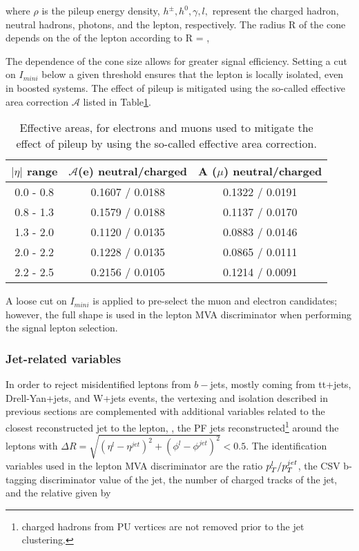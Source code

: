 \noindent where $\rho$ is the pileup energy density, $h^\pm, h^0, \gamma, l,$ represent the charged hadron, neutral hadrons, photons, and the lepton, respectively. The radius R of the cone depends on the \pt of the lepton according to 
\beqn
R = ,
\eeqn

The \pt dependence of the cone size allows for greater signal efficiency. Setting a cut on $I_{mini}$ below a given threshold ensures that the lepton is locally isolated, even in boosted systems. The effect of pileup is mitigated using the so-called effective area correction $\mathcal{A}$ listed in Table\ref{tab:pileup_area}. 

\begin{table}[!htbp]
\centering
\small
\begin{tabular}{ccc}\hline
$|\eta|$ range & $\mathcal{A}$(e) neutral/charged & A ($\mu$) neutral/charged \\\hline
0.0 - 0.8      & 0.1607 / 0.0188                  & 0.1322 / 0.0191 \\
0.8 - 1.3      & 0.1579 / 0.0188                  & 0.1137 / 0.0170 \\
1.3 - 2.0      & 0.1120 / 0.0135                  & 0.0883 / 0.0146 \\
2.0 - 2.2      & 0.1228 / 0.0135                  & 0.0865 / 0.0111 \\
2.2 - 2.5      & 0.2156 / 0.0105                  & 0.1214 / 0.0091 \\ \hline
\end{tabular}
\caption[Effective areas, for electrons and muons.]{ Effective areas, for electrons and muons used to mitigate the effect of pileup by using the so-called effective area correction.}
\label{tab:pileup_area}
\end{table}

A loose cut on $I_{mini}$ is applied to pre-select the muon and electron candidates; however, the full shape is used in the lepton MVA discriminator when performing the signal lepton selection.

\subsubsection*{Jet-related variables}

In order to reject misidentified leptons from $b-$jets, mostly coming from tt+jets, Drell-Yan+jets, and W+jets events, the vertexing and isolation described in previous sections are complemented with additional variables related to the closest reconstructed jet to the lepton, \ie, the PF jets reconstructed\footnote{charged hadrons from PU vertices are not removed prior to the jet clustering.} around the leptons with $\Delta R=\sqrt{( \eta^l - \eta^{jet})^2 + (\phi^l - \phi^{jet})^2} < 0.5$. The identification variables used in the lepton MVA discriminator are the ratio $p_T^l/p_T^{jet}$, the CSV b-tagging discriminator value of the jet, the number of charged tracks of the jet, and the relative \pt given by

